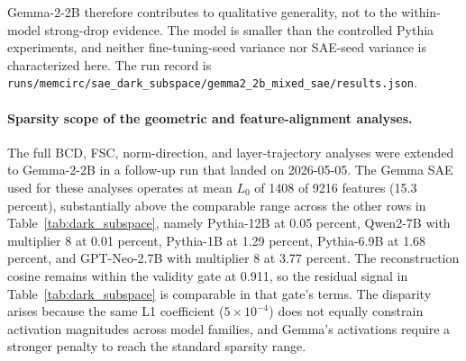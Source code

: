 Gemma-2-2B therefore contributes to qualitative generality, not to the within-model strong-drop evidence. The model is smaller than the controlled Pythia experiments, and neither fine-tuning-seed variance nor SAE-seed variance is characterized here. The run record is \texttt{runs/\allowbreak{}memcirc/\allowbreak{}sae\_\allowbreak{}dark\_\allowbreak{}subspace/\allowbreak{}gemma2\_\allowbreak{}2b\_\allowbreak{}mixed\_\allowbreak{}sae/\allowbreak{}results.json}.

\paragraph{Sparsity scope of the geometric and feature-alignment analyses.}
The full BCD, FSC, norm-direction, and layer-trajectory analyses were extended to Gemma-2-2B in a follow-up run that landed on 2026-05-05. The Gemma SAE used for these analyses operates at mean $L_0$ of 1408 of 9216 features (15.3 percent), substantially above the comparable range across the other rows in Table~\ref{tab:dark_subspace}, namely Pythia-12B at 0.05 percent, Qwen2-7B with multiplier 8 at 0.01 percent, Pythia-1B at 1.29 percent, Pythia-6.9B at 1.68 percent, and GPT-Neo-2.7B with multiplier 8 at 3.77 percent. The reconstruction cosine remains within the validity gate at 0.911, so the residual signal in Table~\ref{tab:dark_subspace} is comparable in that gate's terms. The disparity arises because the same L1 coefficient ($5 \times 10^{-4}$) does not equally constrain activation magnitudes across model families, and Gemma's activations require a stronger penalty to reach the standard sparsity range.


